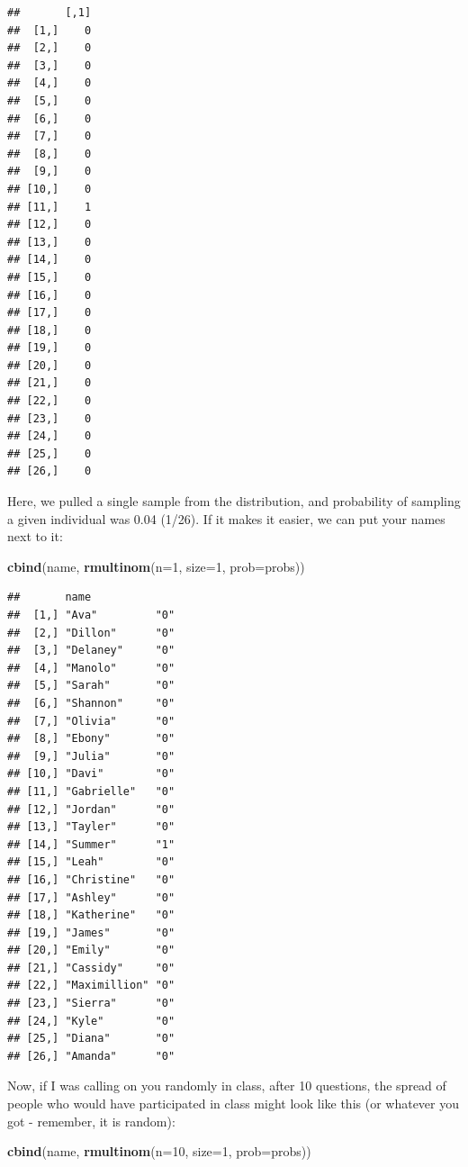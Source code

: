 \documentclass[
]{book}
\newenvironment{Shaded}{\begin{snugshade}}{\end{snugshade}}
\newcommand{\DataTypeTok}[1]{\textcolor[rgb]{0.13,0.29,0.53}{#1}}
\newcommand{\DecValTok}[1]{\textcolor[rgb]{0.00,0.00,0.81}{#1}}
\newcommand{\KeywordTok}[1]{\textcolor[rgb]{0.13,0.29,0.53}{\textbf{#1}}}
\newcommand{\NormalTok}[1]{#1}
\begin{document}
\begin{verbatim}
##       [,1]
##  [1,]    0
##  [2,]    0
##  [3,]    0
##  [4,]    0
##  [5,]    0
##  [6,]    0
##  [7,]    0
##  [8,]    0
##  [9,]    0
## [10,]    0
## [11,]    1
## [12,]    0
## [13,]    0
## [14,]    0
## [15,]    0
## [16,]    0
## [17,]    0
## [18,]    0
## [19,]    0
## [20,]    0
## [21,]    0
## [22,]    0
## [23,]    0
## [24,]    0
## [25,]    0
## [26,]    0
\end{verbatim}

Here, we pulled a single sample from the distribution, and probability of sampling a given individual was 0.04 (1/26). If it makes it easier, we can put your names next to it:

\begin{Shaded}
\begin{Highlighting}[]
\KeywordTok{cbind}\NormalTok{(name, }\KeywordTok{rmultinom}\NormalTok{(}\DataTypeTok{n=}\DecValTok{1}\NormalTok{, }\DataTypeTok{size=}\DecValTok{1}\NormalTok{, }\DataTypeTok{prob=}\NormalTok{probs))}
\end{Highlighting}
\end{Shaded}

\begin{verbatim}
##       name             
##  [1,] "Ava"         "0"
##  [2,] "Dillon"      "0"
##  [3,] "Delaney"     "0"
##  [4,] "Manolo"      "0"
##  [5,] "Sarah"       "0"
##  [6,] "Shannon"     "0"
##  [7,] "Olivia"      "0"
##  [8,] "Ebony"       "0"
##  [9,] "Julia"       "0"
## [10,] "Davi"        "0"
## [11,] "Gabrielle"   "0"
## [12,] "Jordan"      "0"
## [13,] "Tayler"      "0"
## [14,] "Summer"      "1"
## [15,] "Leah"        "0"
## [16,] "Christine"   "0"
## [17,] "Ashley"      "0"
## [18,] "Katherine"   "0"
## [19,] "James"       "0"
## [20,] "Emily"       "0"
## [21,] "Cassidy"     "0"
## [22,] "Maximillion" "0"
## [23,] "Sierra"      "0"
## [24,] "Kyle"        "0"
## [25,] "Diana"       "0"
## [26,] "Amanda"      "0"
\end{verbatim}

Now, if I was calling on you randomly in class, after 10 questions, the spread of people who would have participated in class might look like this (or whatever you got - remember, it is random):

\begin{Shaded}
\begin{Highlighting}[]
\KeywordTok{cbind}\NormalTok{(name, }\KeywordTok{rmultinom}\NormalTok{(}\DataTypeTok{n=}\DecValTok{10}\NormalTok{, }\DataTypeTok{size=}\DecValTok{1}\NormalTok{, }\DataTypeTok{prob=}\NormalTok{probs))}
\end{Highlighting}
\end{Shaded}
\end{document}
